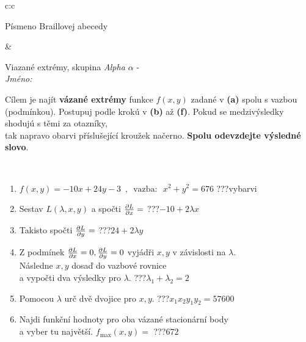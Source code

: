 \documentclass[10pt]{report}
\begin{document}
\begin{tabular}{c:c}
\begin{minipage}[c][104.5mm][t]{0.5\linewidth}
\begin{center}
\begin{minipage}{0.20\linewidth}
\begin{center}
{\small Písmeno Braillovej abecedy}
\end{center}
\end{minipage}
\end{center}
\end{minipage}
&
\begin{minipage}[c][104.5mm][t]{0.5\linewidth}
\begin{center}
\vspace{7mm}
{\huge Viazané extrémy, skupina \textit{Alpha $\alpha$} -}\\[5mm]
\textit{Jméno:}\phantom{xxxxxxxxxxxxxxxxxxxxxxxxxxxxxxxxxxxxxxxxxxxxxxxxxxxxxxxxxxxxxxxxx}\\[5mm]
\begin{minipage}{0.95\linewidth}
\begin{center}
Cílem je najít \textbf{vázané extrémy} funkce $f(x,y)$ zadané v \textbf{(a)} spolu s vazbou (podmínkou). Postupuj podle krokú v \textbf{(b)} až \textbf{(f)}. Pokud se medzivýsledky shodujú s těmi za otazníky,\\tak napravo obarvi příslušející kroužek načerno. \textbf{Spolu odevzdejte výsledné slovo}.
\end{center}
\end{minipage}
\\[1mm]
\begin{minipage}{0.79\linewidth}
\begin{center}
\begin{varwidth}{\linewidth}
\begin{enumerate}
\normalsize
\item $f(x,y)=-10x+24y-3 \enspace , \enspace \mathrm{vazba:} \enspace x^2+y^2=676$\quad \dotfill\; ???\;\dotfill \quad vybarvi
\item Sestav $L(\lambda,x,y)$ a spočti $\pdv{L}{x}=$\quad \dotfill\; ???\;\dotfill \quad $-10+2\lambda x$
\item Takisto spočti $\pdv{L}{y}=$\quad \dotfill\; ???\;\dotfill \quad $24+2\lambda y$
\item Z podmínek $\pdv{L}{x}=0 , \pdv{L}{y}=0$ vyjádři $x,y$ v závislosti na $\lambda$.\\ \phantom{xxxxxx}Následne $x,y$ dosaď do vazbové rovnice\\ \phantom{xxxxxx}a vypočti dva výsledky pro $\lambda$.\quad \dotfill\; ???\;\dotfill \quad $\lambda_1+\lambda_2=2$
\item Pomocou $\lambda$ urč dvě dvojice pro $x,y$.\quad \dotfill\; ???\;\dotfill \quad $x_1 x_2 y_1 y_2=57600$
\item Najdi funkční hodnoty pro oba vázané stacionární body\\ \phantom{xxxxxx}a vyber tu najvětší. $f_{\text{max}}(x,y)=$\quad \dotfill\; ???\;\dotfill \quad $672$

\end{enumerate}
\end{varwidth}
\end{center}
\end{minipage}
\end{center}
\end{minipage}
\end{tabular}
\end{document}
